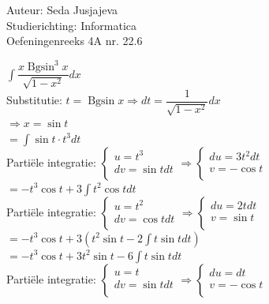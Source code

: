 \documentclass[a4paper]{article}
\newcommand{\integral}{\displaystyle\int}
\newcommand{\Bgsin}{\operatorname{Bgsin}}
\begin{document}
\noindent \large Auteur: Seda Jusjajeva\\
\noindent \large Studierichting: Informatica\\
\noindent \large Oefeningenreeks 4A nr. 22.6 \\

\medskip

\normalsize

$\integral\dfrac{x\Bgsin^3 x}{\sqrt{1-x^2}}dx$ \\

Substitutie: $t = \Bgsin x \Rightarrow dt = \dfrac{1}{\sqrt{1 - x^2}}dx$ \\

$\Rightarrow x = \sin t$ \\

$= \integral\sin t \cdot t^3dt$ \\

Partiële integratie: $\left\{\begin{array}{l}
    u = t^3 \\
    dv = \sin tdt \\
\end{array}\right.\Rightarrow\left\{\begin{array}{l}
    du = 3t^2dt \\
    v = -\cos t \\
\end{array}\right.$ \\

$= -t^3\cos t + 3\integral t^2\cos tdt$ \\ 

Partiële integratie: $\left\{\begin{array}{l}
    u = t^2 \\
    dv = \cos tdt \\
\end{array}\right. \Rightarrow\left\{\begin{array}{l}
    du = 2tdt \\
    v = \sin t \\
\end{array}\right.$ \\

$= -t^3\cos t + 3\left(t^2\sin t - 2\integral t\sin tdt\right)$ \\ 

$= -t^3\cos t + 3t^2\sin t - 6\integral t\sin tdt$ \\

Partiële integratie: $\left\{\begin{array}{l}
    u = t \\
    dv = \sin tdt \\
\end{array}\right.\Rightarrow\left\{\begin{array}{l}
    du = dt \\
    v = -\cos t \\
\end{array}\right.$ \\
\end{document}
